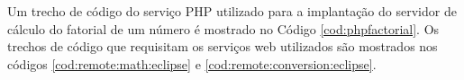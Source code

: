 Um trecho de código do serviço PHP utilizado para a implantação do servidor de
cálculo do fatorial de um número é mostrado no Código \ref{cod:phpfactorial}. Os
trechos de código que requisitam os serviços web utilizados são mostrados nos
códigos \ref{cod:remote:math:eclipse} e \ref{cod:remote:conversion:eclipse}. 

